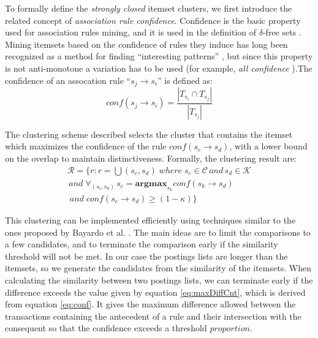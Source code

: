 \documentclass{sig-alternate}
\begin{document}
To formally define the \emph{strongly closed} itemset clusters, we first introduce the related concept of \emph{association rule confidence}. Confidence is the basic property used for association rules mining, and it is used in the definition of $\delta$-free sets \cite{boulicaut2003free}. Mining itemsets based on the confidence of rules they induce has long been recognized as a method for finding ``interesting patterns'' \cite{cohen2001finding}, but since this property is not anti-monotone a variation has to be used (for example, \emph{all confidence} \cite{kim2004ccmine}).The confidence of an assocation rule ``$s_{j} \rightarrow s_i$'' is  defined as:
\begin{equation}\label{eq:conf}conf(s_j \rightarrow s_i) = \frac{|T_{s_i} \cap T_{s_j}|}{|T_{s_j}|}\end{equation}

The clustering scheme described selects the cluster that contains the itemset which maximizes the confidence of the rule $conf(s_c \rightarrow s_d)$, with a lower bound on the overlap to maintain distinctiveness. Formally, the clustering result are: 
\begin{multline}\label{eq:strongClosedFormal}
\mathcal{R} = \{r: r = \bigcup{(s_c, s_d)}\; where\; s_c \in \mathcal{C} \, and \, s_d \in \mathcal{K} \\\,and\; \forall_{(s_c,s_d)} \, s_c = \textbf{argmax}_{s_k} conf(s_k \rightarrow s_d) \\\;and \;conf(s_c \rightarrow s_d) \ge (1 - \kappa)\}
\end{multline}

This clustering can be implemented efficiently using techniques similar to the ones proposed by Bayardo et al. \cite{bayardo2007scaling}. The main ideas are to limit the comparisons to a few candidates, and to terminate the comparison early if the similarity threshold will not be met. In our case the postings lists are longer than the itemsets, so we generate the candidates from the similarity of the itemsets. When calculating the similarity between two postings lists, we can terminate early if the difference exceeds the value given by equation \ref{eq:maxDiffCnt}, which is derived from equation \ref{eq:conf}. It gives the maximum difference allowed between the transactions containing the antecedent of a rule and their intersection with the consequent
so that the confidence exceeds a threshold $proportion$. 
\end{document}
